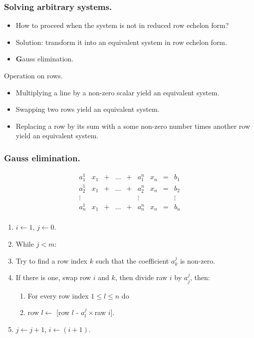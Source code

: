 \documentclass{beamer}
\begin{document}
\begin{frame}
  \frametitle{Solving arbitrary systems.}
  \begin{itemize}
  \item How to proceed when the system is not in reduced row echelon form?
  \item Solution: transform it into an equivalent system in row echelon form.
  \item {\textbf Gauss elimination.}
  \end{itemize}
\end{frame}

\begin{frame}{Operation on rows.}
  \begin{itemize}
  \item Multiplying a line by a non-zero scalar yield an equivalent system.
  \item Swapping two rows yield an equivalent system.
  \item Replacing a row by its sum with a some non-zero number times another row yield an equivalent system. 
  \end{itemize}
\end{frame}

\begin{frame}
  \frametitle{Gauss elimination.}
  \[
  \begin{array}{ccccccccc}
    a^1_1 & x_1 & + & \dots & + & a^n_1 & x_n & = & b_1 \\
    a^1_2 & x_1 & + & \dots & + & a^n_2 & x_n & = & b_2\\
    \vdots&     &   &      &  &\vdots&     &   & \vdots\\
    a^1_n & x_1 & + & \dots & + &  a^n_n & x_n & = & b_n\\
  \end{array}
  \]
  
  \begin{enumerate}
  \item $i \leftarrow 1$, $j \leftarrow 0$.
  \item While $j < m$:
  \item Try to find a row index $k$ such that the coefficient $a^j_k$ is non-zero.
  \item If there is one, swap row $i$ and $k$, then divide raw $i$ by $a^{j}_j$, then:
    \begin{enumerate}
    \item For every row index $1 \le l \le n$ do 
    \item row $l \leftarrow$ [row $l$ - $a^j_l\times$raw $i$].
    \end{enumerate}
  \item $j \leftarrow j+1$, $i \leftarrow (i+1)$.
  \end{enumerate}
  
\end{frame}
\end{document}
